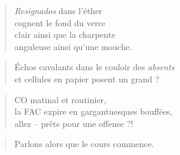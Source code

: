   \begin{verse}
    \emph{Resignados} dans l’éther\\
    cognent le fond du verre\\
    clair ainsi que la charpente\\
    anguleuse ainsi qu’une mouche.
  \end{verse}
  \begin{verse}
    Échos cavalants dans le couloir des \emph{absents}\\
    et cellules en papier posent un grand {\Huge ?}
  \end{verse}
  \begin{verse}
    CO matinal et routinier,\\
    la FAC expire en gargantuesques bouffées,\\
    allez -- prêts pour une offense ?!
  \end{verse}
  \begin{verse}
    Parlons alors que le cours commence.
  \end{verse}
